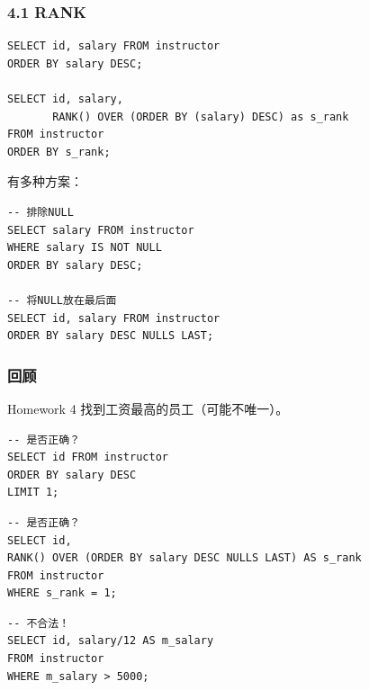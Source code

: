 \documentclass[aspectratio=169, 14pt]{beamer}
\begin{document}
\begin{frame}[fragile]
	\frametitle{4.1 RANK}

	\begin{verbatim}
SELECT id, salary FROM instructor
ORDER BY salary DESC;

SELECT id, salary, 
       RANK() OVER (ORDER BY (salary) DESC) as s_rank
FROM instructor
ORDER BY s_rank;
    \end{verbatim}

	\pause

\end{frame}

\begin{frame}[fragile]

	有多种方案：
	\begin{verbatim}
-- 排除NULL
SELECT salary FROM instructor
WHERE salary IS NOT NULL
ORDER BY salary DESC;

-- 将NULL放在最后面
SELECT id, salary FROM instructor
ORDER BY salary DESC NULLS LAST;
\end{verbatim}

\end{frame}

\begin{frame}[fragile]
	\frametitle{回顾}
	\begin{exampleblock}{Homework 4}
		找到工资最高的员工（可能不唯一）。
	\end{exampleblock}

	\begin{verbatim}
-- 是否正确？
SELECT id FROM instructor
ORDER BY salary DESC
LIMIT 1;
\end{verbatim}

\end{frame}

\begin{frame}[fragile]

	\begin{verbatim}
-- 是否正确？
SELECT id,
RANK() OVER (ORDER BY salary DESC NULLS LAST) AS s_rank
FROM instructor
WHERE s_rank = 1;
    \end{verbatim}

	\pause

	\begin{verbatim}
-- 不合法！
SELECT id, salary/12 AS m_salary
FROM instructor
WHERE m_salary > 5000;
    \end{verbatim}

\end{frame}
\end{document}

